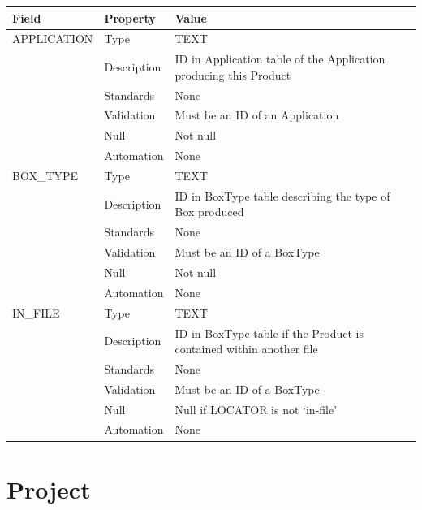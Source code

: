 \begin{longtable}[]{@{}
  >{\raggedright\arraybackslash}p{}
  >{\raggedright\arraybackslash}p{}
  >{\raggedright\arraybackslash}p{}@{}}
\toprule\noalign{}
\begin{minipage}[b]{\linewidth}\raggedright
Field
\end{minipage} & \begin{minipage}[b]{\linewidth}\raggedright
Property
\end{minipage} & \begin{minipage}[b]{\linewidth}\raggedright
Value
\end{minipage} \\
\midrule\noalign{}
\endhead
\bottomrule\noalign{}
\endlastfoot
APPLICATION & Type & TEXT \\
& Description & ID in Application table of the Application producing
this Product \\
& Standards & None \\
& Validation & Must be an ID of an Application \\
& Null & Not null \\
& Automation & None \\
BOX\_TYPE & Type & TEXT \\
& Description & ID in BoxType table describing the type of Box
produced \\
& Standards & None \\
& Validation & Must be an ID of a BoxType \\
& Null & Not null \\
& Automation & None \\
IN\_FILE & Type & TEXT \\
& Description & ID in BoxType table if the Product is contained within
another file \\
& Standards & None \\
& Validation & Must be an ID of a BoxType \\
& Null & Null if LOCATOR is not `in-file' \\
& Automation & None \\
\end{longtable}

\section{Project}\label{project-1}

